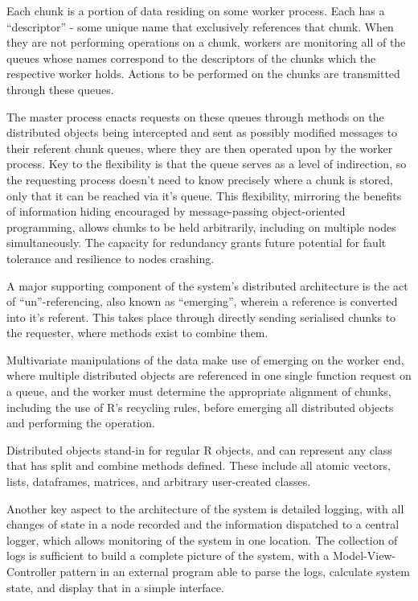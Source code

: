 Each chunk is a portion of data residing on some worker process.
Each has a ``descriptor'' - some unique name that exclusively references that chunk.
When they are not performing operations on a chunk, workers are monitoring all of the queues whose names correspond to the descriptors of the chunks which the respective worker holds.
Actions to be performed on the chunks are transmitted through these queues.

The master process enacts requests on these queues through methods on the distributed objects being intercepted and sent as possibly modified messages to their referent chunk queues, where they are then operated upon by the worker process.
Key to the flexibility is that the queue serves as a level of indirection, so the requesting process doesn't need to know precisely where a chunk is stored, only that it can be reached via it's queue.
This flexibility, mirroring the benefits of information hiding encouraged by message-passing object-oriented programming, allows chunks to be held arbitrarily, including on multiple nodes simultaneously.
The capacity for redundancy grants future potential for fault tolerance and resilience to nodes crashing.

A major supporting component of the system's distributed architecture is the act of ``un''-referencing, also known as ``emerging'', wherein a reference is converted into it's referent.
This takes place through directly sending serialised chunks to the requester, where methods exist to combine them.

Multivariate manipulations of the data make use of emerging on the worker end, where multiple distributed objects are referenced in one single function request on a queue, and the worker must determine the appropriate alignment of chunks, including the use of R's recycling rules, before emerging all distributed objects and performing the operation.

Distributed objects stand-in for regular R objects, and can represent any class that has split and combine methods defined.
These include all atomic vectors, lists, dataframes, matrices, and arbitrary user-created classes.

Another key aspect to the architecture of the system is detailed logging, with all changes of state in a node recorded and the information dispatched to a central logger, which allows monitoring of the system in one location. The collection of logs is sufficient to build a complete picture of the system, with a Model-View-Controller pattern in an external program able to parse the logs, calculate system state, and display that in a simple interface.


